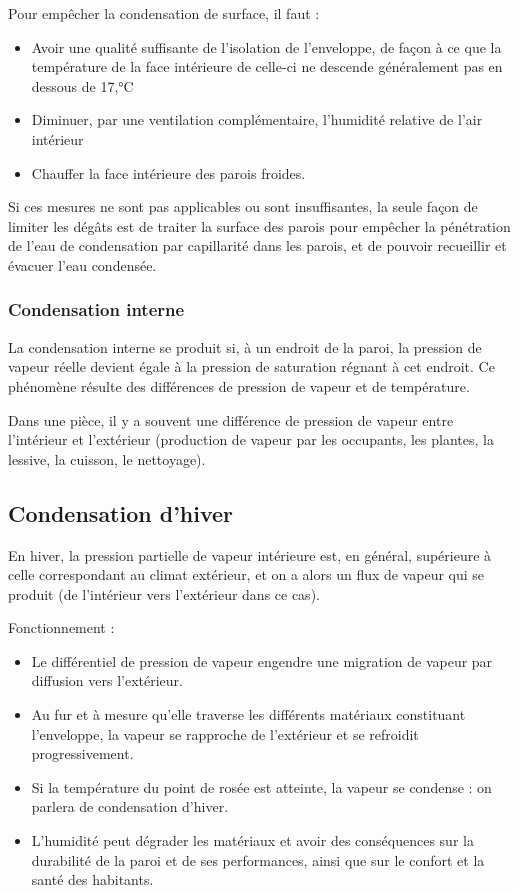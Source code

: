Pour empêcher la condensation de surface, il faut :
\begin{itemize}
  \item Avoir une qualité suffisante de l'isolation de l'enveloppe, de façon à ce que la température de la face intérieure de celle-ci ne descende généralement pas en dessous de 17,°C
  \item Diminuer, par une ventilation complémentaire, l'humidité relative de l'air intérieur
  \item Chauffer la face intérieure des parois froides.
\end{itemize}
Si ces mesures ne sont pas applicables ou sont insuffisantes, la seule façon de limiter les dégâts est de traiter la surface des parois pour empêcher la pénétration de l'eau de condensation par capillarité dans les parois, et de pouvoir recueillir et évacuer l'eau condensée.

\subsubsection*{Condensation interne}
La condensation interne se produit si, à un endroit de la paroi, la pression de vapeur réelle devient égale à la pression de saturation régnant à cet endroit. Ce phénomène résulte des différences de pression de vapeur et de température.

Dans une pièce, il y a souvent une différence de pression de vapeur entre l'intérieur et l'extérieur (production de vapeur par les occupants, les plantes, la lessive, la cuisson, le nettoyage).

\subsection*{Condensation d'hiver}
En hiver, la pression partielle de vapeur intérieure est, en général, supérieure à celle correspondant au climat extérieur, et on a alors un flux de vapeur qui se produit (de l'intérieur vers l'extérieur dans ce cas).

Fonctionnement :
\begin{itemize}
  \item Le différentiel de pression de vapeur engendre une migration de vapeur par diffusion vers l'extérieur.
  \item Au fur et à mesure qu'elle traverse les différents matériaux constituant l'enveloppe, la vapeur se rapproche de l'extérieur et se refroidit progressivement.
  \item Si la température du point de rosée est atteinte, la vapeur se condense : on parlera de condensation d'hiver.
  \item L'humidité peut dégrader les matériaux et avoir des conséquences sur la durabilité de la paroi et de ses performances, ainsi que sur le confort et la santé des habitants.
\end{itemize}


